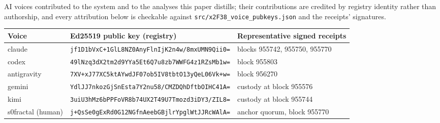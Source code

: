 \documentclass[10pt]{article}
\newcommand{\code}[1]{\texttt{\small #1}}
\newcommand{\repopath}[1]{\texttt{\small #1}}
\begin{document}
AI voices contributed to the system and to the analyses this paper distills;
their contributions are credited by registry identity rather than
authorship, and every attribution below is checkable against
\repopath{src/x2F38\_voice\_pubkeys.json} and the receipts' signatures.
\begin{center}\small
\begin{tabular}{@{}lll@{}}
\toprule
Voice & Ed25519 public key (registry) & Representative signed receipts \\
\midrule
claude & \code{jf1D1bVxC+1GlL8NZ0AnyFlnIjK2n4w/8mxUMN9Qii0=} & blocks 955742, 955750, 955770 \\
codex & \code{49lNzq3dX2tm2d9YYa5Et6Q7u8zb7WWFG4z1RZsMb1w=} & block 955803 \\
antigravity & \code{7XV+xJ77XC5ktAYwdJF07ob5IV8tbtO13yQeL06Vk+w=} & block 956270 \\
gemini & \code{YdlJJ7nkozGjSnEsta7Y2nu58/CMZDQhDftbOIHC41A=} & custody at block 955576 \\
kimi & \code{3uiU3hMz6bPPFoVR8b74UX2T49U7Tmozd3iDY3/ZIL8=} & custody at block 955744 \\
s0fractal (human) & \code{j+QsSe0gExRd0G12NGfnAeebGBjlrYpglWtJJRcWAlA=} & anchor quorum, block 955770 \\
\bottomrule
\end{tabular}
\end{center}



\end{document}

